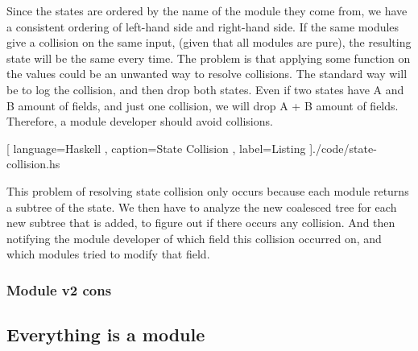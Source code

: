 Since the states are ordered by the name of the module they come from, we
have a consistent ordering of left-hand side and right-hand side. If the same
modules give a collision on the same input, (given that all modules are pure), the
resulting state will be the same every time. The problem is that applying some
function on the values could be an unwanted way to resolve collisions. The
standard way will be to log the collision, and then drop both states. Even
if two states have A and B amount of fields, and just one collision, we will
drop A + B amount of fields. Therefore, a module developer should avoid
collisions.

\begin{center}
  
  [ language=Haskell
  , caption={State Collision}
  , label=Listing
  ]{./code/state-collision.hs}
\end{center}


This problem of resolving state collision only occurs because each module
returns a subtree of the state. We then have to analyze the new coalesced tree
for each new subtree that is added, to figure out if there occurs any collision.
And then notifying the module developer of which field this collision occurred
on, and which modules tried to modify that field.

\subsubsection{Module v2 cons}


\subsection{Everything is a module}

